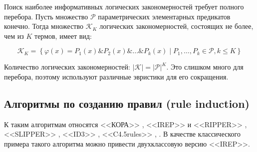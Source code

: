 \documentclass[12pt]{article}
\begin{document}
Поиск наиболее информативных логических закономерностей требует
полного перебора. Пусть множество \(\mathcal{P}\) параметрических
элементарных предикатов конечно. Тогда множество \(\mathcal{K}_K\)
логических закономерностей, состоящих не более, чем из \(K\) термов,
имеет вид:

\[
\mathcal{K}_K =
\left\{
 \varphi(x) = P_1(x) \& P_2(x) \& \dots \& P_k(x) \mid
  P_1, \dots, P_k \in \mathcal{P}, k \leq K
\right\}
\]

Количество логических закономерностей: \(\lvert \mathcal{K} \rvert =
\lvert \mathcal{P} \rvert^{K}\). Это слишком много для перебора,
поэтому используют различные эвристики для его сокращения.



\subsection{Алгоритмы по созданию правил (rule induction)}

К таким алгоритмам относятся <<КОРА>> \cite{vainzvaig73kora}, <<IREP>>
и <<RIPPER>> \cite{cohen95fast}, <<SLIPPER>> \cite{cohen99simple},
<<ID3>> \cite{quinlan86induction}, <<C4.5rules>>
\cite{quinlan93programs}, \cite{quinlan96bagging}.  В качестве
классического примера такого алгоритма можно привести двухклассовую
версию <<IREP>>.
\end{document}

